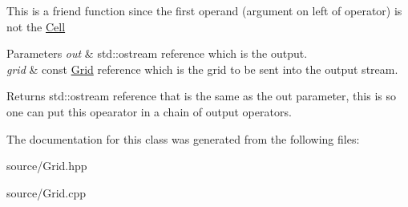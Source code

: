 This is a friend function since the first operand (argument on left of operator) is not the \hyperlink{class_cell}{Cell}


\begin{DoxyParams}{Parameters}
{\em out} & std\+::ostream reference which is the output. \\
\hline
{\em grid} & const \hyperlink{class_grid}{Grid} reference which is the grid to be sent into the output stream.\\
\hline
\end{DoxyParams}
\begin{DoxyReturn}{Returns}
std\+::ostream reference that is the same as the out parameter, this is so one can put this opearator in a chain of output operators. 
\end{DoxyReturn}


The documentation for this class was generated from the following files\+:\begin{DoxyCompactItemize}
\item 
source/Grid.\+hpp\item 
source/Grid.\+cpp\end{DoxyCompactItemize}

